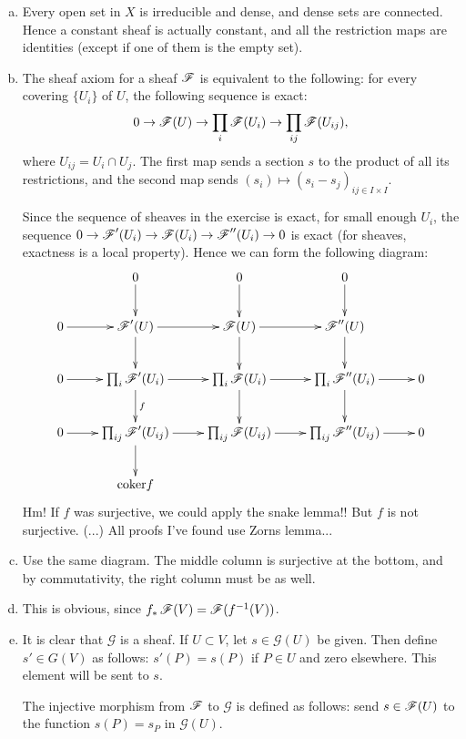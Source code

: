 \documentclass[11pt, english]{article}
\begin{document}
\begin{sol}
\begin{enumerate}[a)]
\item Every open set in $X$ is irreducible and dense, and dense sets are connected. Hence a constant sheaf is actually constant, and all the restriction maps are identities (except if one of them is the empty set).
\item The sheaf axiom for a sheaf $\operatorname{\mathscr{F}}$ is equivalent to the following: for every covering $\{U_i \}$ of $U$, the following sequence is exact:
$$
0 \to \operatorname{\mathscr{F}}(U) \to \prod_i \operatorname{\mathscr{F}}(U_i) \to \prod_{ij} \operatorname{\mathscr{F}}(U_{ij}),
$$
where $U_{ij}= U_i \cap U_j$. The first map sends a section $s$ to the product of all its restrictions, and the second map sends $(s_i) \mapsto (s_i-s_j)_{ij \in I \times I}$.

Since the sequence of sheaves in the exercise is exact, for small enough $U_i$, the sequence $0 \to \operatorname{\mathscr{F}}'(U_i) \to \operatorname{\mathscr{F}}(U_i) \to \operatorname{\mathscr{F}}''(U_i) \to 0$ is exact (for sheaves, exactness is a local property). Hence we can form the following diagram: 
\[
\xymatrix{
 & 0\ar[d] & 0 \ar[d] & 0 \ar[d] \\
 0 \ar[r] & \FF'(U) \ar[r]\ar[d] & \FF(U) \ar[r]\ar[d] & \FF''(U)\ar[d] \\
 0 \ar[r] & \prod_i \FF'(U_i) \ar[r]\ar[d]^f & \prod_i \FF(U_i) \ar[r]\ar[d] & \prod_i\FF''(U_i) \ar[r]\ar[d] & 0  \\
 0 \ar[r] &\prod_{ij} \FF'(U_{ij}) \ar[r]\ar[d] & \prod_{ij} \FF(U_{ij}) \ar[r] & \prod_{ij}\FF''(U_{ij}) \ar[r] & 0 \\
 & \coker f
}
\]
Hm! If $f$ was surjective, we could apply the snake lemma!! But $f$ is not surjective. (...) All proofs I've found use Zorns lemma...
\item Use the same diagram. The middle column is surjective at the bottom, and by commutativity, the right column must be as well.
\item This is obvious, since $f_\ast \operatorname{\mathscr{F}}(V) = \operatorname{\mathscr{F}}(f^{-1}(V))$.
\item It is clear that $\mathscr G$ is a sheaf. If $U \subset V$, let $s \in \mathscr G(U)$ be given. Then define $s' \in G(V)$ as follows: $s'(P)=s(P)$ if $P \in U$ and zero elsewhere. This element will be sent to $s$.

The injective morphism from $\operatorname{\mathscr{F}}$ to $\mathscr G$ is defined as follows: send $s \in \operatorname{\mathscr{F}}(U)$ to the function $s(P)=s_P$ in $\mathscr G(U)$.
\end{enumerate}
\end{sol}
\end{document}
